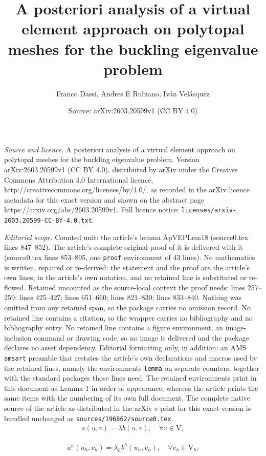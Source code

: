 \documentclass[10pt,a4paper]{amsart}
\title{A posteriori analysis of a virtual element approach on polytopal meshes for the buckling eigenvalue problem}
\author{Franco Dassi, Andres E Rubiano, Iv\'an Vel\'asquez}
\date{Source: arXiv:2603.20599v1 (CC BY 4.0)}
\def\rV{\mathrm{V}}
\begin{document}
\maketitle

\noindent\emph{Source and licence.} A posteriori analysis of a virtual element approach on polytopal meshes for the buckling eigenvalue problem. Version arXiv:2603.20599v1 (CC BY 4.0), distributed by arXiv under the Creative Commons Attribution 4.0 International licence, http://creativecommons.org/licenses/by/4.0/, as recorded in the arXiv licence metadata for this exact version and shown on the abstract page https://arxiv.org/abs/2603.20599v1. Full licence notice: \texttt{licenses/arxiv-2603.20599-CC-BY-4.0.txt}.\par\smallskip

\noindent\textit{Editorial scope.} Counted unit: the article's lemma ApVEPLem18 (source0.tex lines 847--852). The article's complete original proof of it is delivered with it (source0.tex lines 853--895, one \texttt{proof} environment of 43 lines). No mathematics is written, repaired or re-derived: the statement and the proof are the article's own lines, in the article's own notation, and no retained line is substituted or re-flowed.  Retained uncounted as the source-local context the proof needs: lines 257--259; lines 425--427; lines 651--660; lines 821--830; lines 833--840.  Nothing was omitted from any retained span, so the package carries no omission record.  No retained line contains a citation, so the wrapper carries no bibliography and no bibliography entry.  No retained line contains a figure environment, an image-inclusion command or drawing code, so no image is delivered and the package declares no asset dependency.  Editorial formatting only, in addition: an AMS \texttt{amsart} preamble that restates the article's own declarations and macros used by the retained lines, namely the environments \texttt{lemma} on separate counters, together with the standard packages those lines need.  The retained environments print in this document as Lemma 1 in order of appearance, whereas the article prints the same items with the numbering of its own full document.  The complete native source of the article as distributed in the arXiv e-print for this exact version is bundled unchanged as \texttt{sources/196862/source0.tex}.
\begin{align}\label{WMPr}
    a(u,v) = \lambda b(u,v), \quad \forall v\in \rV ,
\end{align}

\begin{align}\label{WDPr}
    a^h(u_h,v_h) = \lambda_h b^h(u_h,v_h), \quad \forall v_h\in \rV_h.
\end{align}
\end{document}
